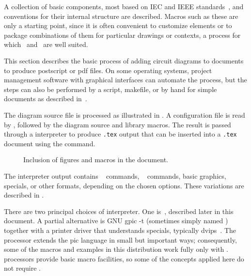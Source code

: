 A collection of basic components, most based on IEC and IEEE
standards~\cite{IECstd,IEEEstd},
and conventions for their internal
structure are described.  Macros such as these are only a starting
point, since it is often convenient to customize elements or to package
combinations of them for particular drawings or contexts,
a process for which \Mfour\ and \pic\ are well suited.

This section describes the basic process of adding circuit diagrams to
\latex documents to produce postscript or pdf files.  On some operating
systems, project management software with graphical interfaces can
automate the process, but the steps can also be performed by a script,
makefile, or by hand for simple documents as described in~.

The diagram source file is processed as illustrated in
.  A configuration file is read by \Mfour,
followed by the diagram source and library macros.
The result is passed through a
\pic interpreter to produce {\tt .tex} output that can be inserted
into a {\tt .tex} document using the \verb|| command.

\begin{figure}[ht]
 \caption{Inclusion of figures and macros in the \latex document.
 \label{Flowdiag}}
 \end{figure}

\noindent
The interpreter output contains
\TPGF~\cite{tikz} commands,
\PSTricks~\cite{pstricks} commands,
basic \latex graphics, 
\tpic specials, or other formats,
depending on the chosen options.
These variations are described in .

There are two principal choices of \pic interpreter.  One is~\dpic,
described later in this document.  A partial alternative is
GNU {\bq gpic -t} (sometimes simply named \pic)~\cite{gpic}
together with a printer driver
that understands \tpic specials, typically {\bq dvips}~\cite{dvips}.
The \dpic processor extends the pic language in small but important ways;
consequently, some of the macros and examples in this distribution work fully
only with \dpic.
\Pic processors provide basic macro facilities, so some of the
concepts applied here do not require \Mfour.

